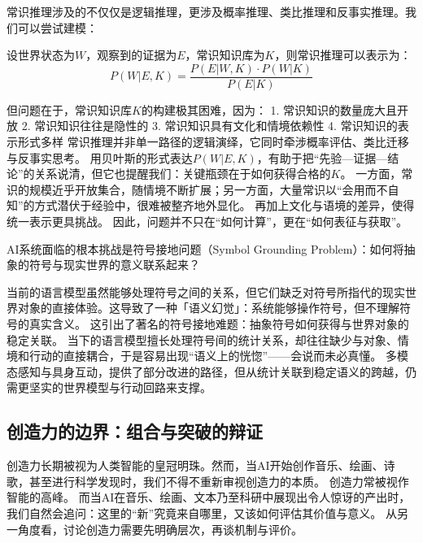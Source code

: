 常识推理涉及的不仅仅是逻辑推理，更涉及概率推理、类比推理和反事实推理。我们可以尝试建模：

设世界状态为$W$，观察到的证据为$E$，常识知识库为$K$，则常识推理可以表示为：
\begin{equation}
P(W|E, K) = \frac{P(E|W, K) \cdot P(W|K)}{P(E|K)}
\end{equation}

但问题在于，常识知识库$K$的构建极其困难，因为：
1. 常识知识的数量庞大且开放
2. 常识知识往往是隐性的
3. 常识知识具有文化和情境依赖性
4. 常识知识的表示形式多样
常识推理并非单一路径的逻辑演绎，它同时牵涉概率评估、类比迁移与反事实思考。
用贝叶斯的形式表达$P(W|E,K)$，有助于把“先验—证据—结论”的关系说清，但它也提醒我们：关键瓶颈在于如何获得合格的$K$。
一方面，常识的规模近乎开放集合，随情境不断扩展；另一方面，大量常识以“会用而不自知”的方式潜伏于经验中，很难被整齐地外显化。
再加上文化与语境的差异，使得统一表示更具挑战。
因此，问题并不只在“如何计算”，更在“如何表征与获取”。

AI系统面临的根本挑战是符号接地问题（Symbol Grounding Problem）：如何将抽象的符号与现实世界的意义联系起来？

当前的语言模型虽然能够处理符号之间的关系，但它们缺乏对符号所指代的现实世界对象的直接体验。这导致了一种「语义幻觉」：系统能够操作符号，但不理解符号的真实含义。
这引出了著名的符号接地难题：抽象符号如何获得与世界对象的稳定关联。
当下的语言模型擅长处理符号间的统计关系，却往往缺少与对象、情境和行动的直接耦合，于是容易出现“语义上的恍惚”——会说而未必真懂。
多模态感知与具身互动，提供了部分改进的路径，但从统计关联到稳定语义的跨越，仍需更坚实的世界模型与行动回路来支撑。



\subsection{创造力的边界：组合与突破的辩证}

创造力长期被视为人类智能的皇冠明珠。然而，当AI开始创作音乐、绘画、诗歌，甚至进行科学发现时，我们不得不重新审视创造力的本质。
创造力常被视作智能的高峰。
而当AI在音乐、绘画、文本乃至科研中展现出令人惊讶的产出时，我们自然会追问：这里的“新”究竟来自哪里，又该如何评估其价值与意义。
从另一角度看，讨论创造力需要先明确层次，再谈机制与评价。

